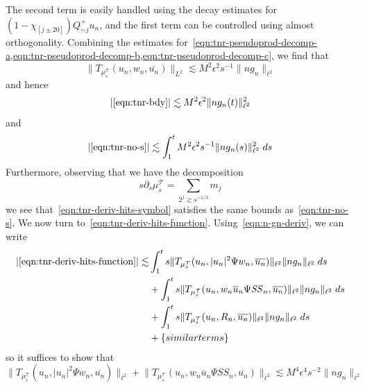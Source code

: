 \documentclass[letterpaper, reqno,final]{amsart}
\newcommand{\cT}{\mathcal{T}}
\newcommand{\mSS}{\mathit{SS}}
\newcommand{\discrAvg}{\Psi}
\newcommand{\btext}[1]{\left\{\textup{#1}\right\}}
\newcommand{\bsim}{\btext{similar terms}}
\begin{document}
The second term is easily handled using the decay estimates for $(1-\chi_{[j\pm 20]})Q^+_{\sim j} u_n$, and the first term can be controlled using almost orthogonality.  Combining the estimates for~\cref{eqn:tnr-pseudoprod-decomp-a,eqn:tnr-pseudoprod-decomp-b,eqn:tnr-pseudoprod-decomp-c}, we find that
\begin{equation}\label{eqn:T-mu-s-bd}
    \lVert T_{\mu_s^\cT}(u_n, w_n, \overline{u_n}) \rVert_{L^2} \lesssim M^2\epsilon^2 s^{-1}\lVert ng_n \rVert_{\ell^2}
\end{equation}
and hence
\begin{equation*}
    |\eqref{eqn:tnr-bdy}| \lesssim M^2\epsilon^2 \lVert ng_n(t) \rVert_{\ell^2}^2
\end{equation*}
and
\begin{equation*}
    |\eqref{eqn:tnr-no-s}| \lesssim \int_1^t M^2\epsilon^2 s^{-1}\lVert ng_n(s) \rVert_{\ell^2}^2 \;ds
\end{equation*}
Furthermore, observing that we have the decomposition
\begin{equation*}
    s\partial_s \mu^\cT_s = \sum_{2^j \gtrsim s^{-1/3}} m_j
\end{equation*}
we see that~\eqref{eqn:tnr-deriv-hits-symbol} satisfies the same bounds as~\eqref{eqn:tnr-no-s}.  We now turn to~\eqref{eqn:tnr-deriv-hits-function}.  Using~\eqref{eqn:n-gn-deriv}, we can write
\begin{equation*}\begin{split}
    \left|\eqref{eqn:tnr-deriv-hits-function}\right| \lesssim& \int_1^t s\lVert T_{\mu^\cT_s}(u_n, |u_n|^2 \discrAvg w_n, \overline{u_n})\rVert_{\ell^2} \lVert n g_n \rVert_{\ell^2}\;ds\\
    &+ \int_1^t s\lVert T_{\mu^\cT_s}(u_n, w_n \overline{u}_n \discrAvg \mSS_n, \overline{u_n})\rVert_{\ell^2} \lVert n g_n \rVert_{\ell^2}\;ds\\
    &+ \int_1^t s\lVert T_{\mu^\cT_s}(u_n, R_n, \overline{u_n})\rVert_{\ell^2} \lVert n g_n \rVert_{\ell^2}\;ds\\
    &+\bsim
\end{split}\end{equation*}
so it suffices to show that
\begin{equation}\label{eqn:tnr-dhf-12-bound}
    \lVert T_{\mu^\cT_s}(u_n, |u_n|^2 \discrAvg w_n, \overline{u_n})\rVert_{\ell^2} + \lVert T_{\mu^\cT_s}(u_n, w_n \overline{u}_n \discrAvg \mSS_n, \overline{u_n})\rVert_{\ell^2} \lesssim M^4 \epsilon^4 s^{-2} \lVert ng_n \rVert_{\ell^2}
\end{equation}
\end{document}
